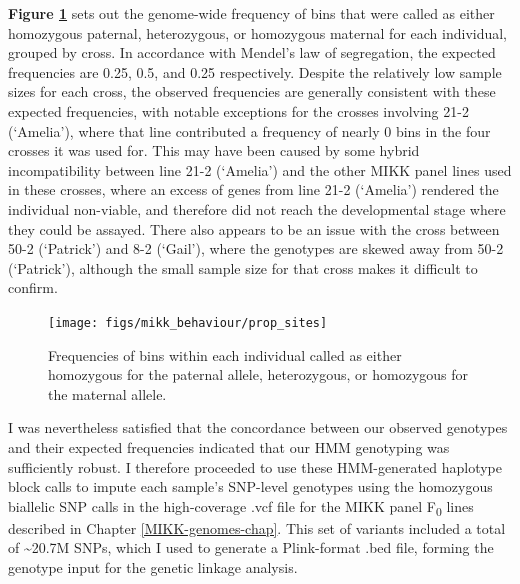 \documentclass[
]{book}
\begin{document}
\textbf{Figure \ref{fig:F2-prop-sites}} sets out the genome-wide frequency of bins that were called as either homozygous paternal, heterozygous, or homozygous maternal for each individual, grouped by cross. In accordance with Mendel's law of segregation, the expected frequencies are 0.25, 0.5, and 0.25 respectively. Despite the relatively low sample sizes for each cross, the observed frequencies are generally consistent with these expected frequencies, with notable exceptions for the crosses involving \textcolor{21-2 (‘Amelia’)_49B500}{21-2 (‘Amelia’)}, where that line contributed a frequency of nearly 0 bins in the four crosses it was used for. This may have been caused by some hybrid incompatibility between line \textcolor{21-2 (‘Amelia’)_49B500}{21-2 (‘Amelia’)} and the other MIKK panel lines used in these crosses, where an excess of genes from line \textcolor{21-2 (‘Amelia’)_49B500}{21-2 (‘Amelia’)} rendered the individual non-viable, and therefore did not reach the developmental stage where they could be assayed. There also appears to be an issue with the cross between \textcolor{50-2 (‘Patrick’)_BB81FF}{50-2 (‘Patrick’)} and \textcolor{8-2 (‘Gail’)_FF699C}{8-2 (‘Gail’)}, where the genotypes are skewed away from \textcolor{50-2 (‘Patrick’)_BB81FF}{50-2 (‘Patrick’)}, although the small sample size for that cross makes it difficult to confirm.



\begin{figure}
\texttt{[image: figs/mikk\_behaviour/prop\_sites]} \caption{Frequencies of bins within each individual called as either homozygous for the paternal allele, heterozygous, or homozygous for the maternal allele.}\label{fig:F2-prop-sites}
\end{figure}

I was nevertheless satisfied that the concordance between our observed genotypes and their expected frequencies indicated that our HMM genotyping was sufficiently robust. I therefore proceeded to use these HMM-generated haplotype block calls to impute each sample's SNP-level genotypes using the homozygous biallelic SNP calls in the high-coverage .vcf file for the MIKK panel F\textsubscript{0} lines described in Chapter \ref{MIKK-genomes-chap}. This set of variants included a total of \textasciitilde20.7M SNPs, which I used to generate a Plink-format .bed file, forming the genotype input for the genetic linkage analysis.
\end{document}
